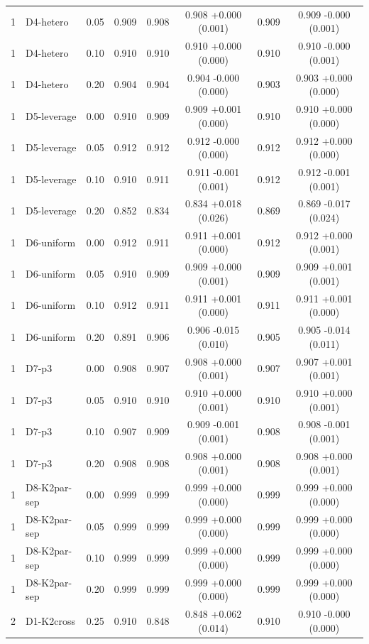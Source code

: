 {\begin{longtable}{llcccccc}
1 & D4-hetero & 0.05 & 0.909 & 0.908 & 0.908 +0.000 (0.001) & 0.909 & 0.909 -0.000 (0.001) \\
1 & D4-hetero & 0.10 & 0.910 & 0.910 & 0.910 +0.000 (0.000) & 0.910 & 0.910 -0.000 (0.001) \\
1 & D4-hetero & 0.20 & 0.904 & 0.904 & 0.904 -0.000 (0.000) & 0.903 & 0.903 +0.000 (0.000) \\
1 & D5-leverage & 0.00 & 0.910 & 0.909 & 0.909 +0.001 (0.000) & 0.910 & 0.910 +0.000 (0.000) \\
1 & D5-leverage & 0.05 & 0.912 & 0.912 & 0.912 -0.000 (0.000) & 0.912 & 0.912 +0.000 (0.000) \\
1 & D5-leverage & 0.10 & 0.910 & 0.911 & 0.911 -0.001 (0.001) & 0.912 & 0.912 -0.001 (0.001) \\
1 & D5-leverage & 0.20 & 0.852 & 0.834 & 0.834 +0.018 (0.026) & 0.869 & 0.869 -0.017 (0.024) \\
1 & D6-uniform & 0.00 & 0.912 & 0.911 & 0.911 +0.001 (0.000) & 0.912 & 0.912 +0.000 (0.001) \\
1 & D6-uniform & 0.05 & 0.910 & 0.909 & 0.909 +0.000 (0.001) & 0.909 & 0.909 +0.001 (0.001) \\
1 & D6-uniform & 0.10 & 0.912 & 0.911 & 0.911 +0.001 (0.000) & 0.911 & 0.911 +0.001 (0.000) \\
1 & D6-uniform & 0.20 & 0.891 & 0.906 & 0.906 -0.015 (0.010) & 0.905 & 0.905 -0.014 (0.011) \\
1 & D7-p3 & 0.00 & 0.908 & 0.907 & 0.908 +0.000 (0.001) & 0.907 & 0.907 +0.001 (0.001) \\
1 & D7-p3 & 0.05 & 0.910 & 0.910 & 0.910 +0.000 (0.001) & 0.910 & 0.910 +0.000 (0.001) \\
1 & D7-p3 & 0.10 & 0.907 & 0.909 & 0.909 -0.001 (0.001) & 0.908 & 0.908 -0.001 (0.001) \\
1 & D7-p3 & 0.20 & 0.908 & 0.908 & 0.908 +0.000 (0.001) & 0.908 & 0.908 +0.000 (0.001) \\
1 & D8-K2par-sep & 0.00 & 0.999 & 0.999 & 0.999 +0.000 (0.000) & 0.999 & 0.999 +0.000 (0.000) \\
1 & D8-K2par-sep & 0.05 & 0.999 & 0.999 & 0.999 +0.000 (0.000) & 0.999 & 0.999 +0.000 (0.000) \\
1 & D8-K2par-sep & 0.10 & 0.999 & 0.999 & 0.999 +0.000 (0.000) & 0.999 & 0.999 +0.000 (0.000) \\
1 & D8-K2par-sep & 0.20 & 0.999 & 0.999 & 0.999 +0.000 (0.000) & 0.999 & 0.999 +0.000 (0.000) \\
2 & D1-K2cross & 0.25 & 0.910 & 0.848 & 0.848 +0.062 (0.014) & 0.910 & 0.910 -0.000 (0.000) \\

\end{longtable}}
